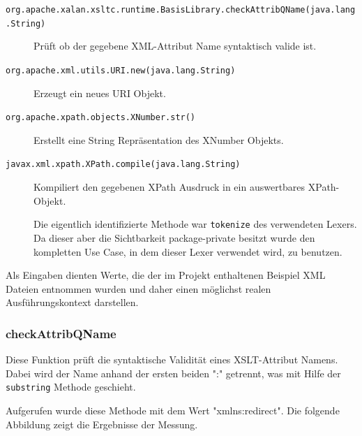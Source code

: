 \begin{description}
	\item [\texttt{org.apache.xalan.xsltc.runtime.BasisLibrary.checkAttribQName(java.lang.String)}]
		Prüft ob der gegebene XML-Attribut Name syntaktisch valide ist.
	\item [\texttt{org.apache.xml.utils.URI.new(java.lang.String)}]
		Erzeugt ein neues URI Objekt. 
	\item [\texttt{org.apache.xpath.objects.XNumber.str()}]
		Erstellt eine String Repräsentation des XNumber Objekts.
	\item [\texttt{javax.xml.xpath.XPath.compile(java.lang.String)}]
		Kompiliert den gegebenen XPath Ausdruck in ein auswertbares XPath-Objekt.
		
		Die eigentlich identifizierte Methode war \texttt{tokenize} des verwendeten 
		Lexers. Da dieser aber die Sichtbarkeit package-private
		besitzt wurde den kompletten Use Case, in dem dieser Lexer verwendet wird, 
		zu benutzen.
\end{description}

Als Eingaben dienten Werte, die der im Projekt enthaltenen Beispiel XML Dateien entnommen wurden 
und daher einen möglichst realen Ausführungskontext darstellen.

\subsubsection{checkAttribQName}

Diese Funktion prüft die syntaktische Validität eines XSLT-Attribut Namens. Dabei wird 
der Name anhand der ersten beiden ":" getrennt, was mit Hilfe der \texttt{substring} Methode
geschieht. 

Aufgerufen wurde diese Methode mit dem Wert "xmlns:redirect". Die folgende Abbildung zeigt 
die Ergebnisse der Messung.

